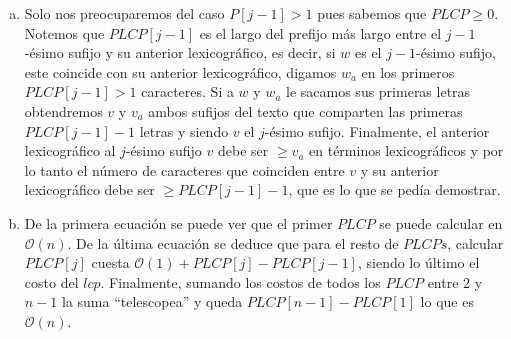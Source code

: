 \documentclass[dcc,uchile]{fcfmcourse}
\theoremstyle{plain}
\theoremstyle{definition}
\begin{document}
\begin{problems}
\begin{enumerate}[a)]
    \item Solo nos preocuparemos del caso $P[j-1]>1$ pues sabemos que $PLCP \ge 0$.\\
    Notemos que $PLCP[j-1]$ es el largo del prefijo más largo entre el $j-1$-ésimo sufijo y su anterior lexicográfico, es decir, si $w$ es el $j-1$-ésimo sufijo, este coincide con su anterior lexicográfico, digamos $w_{a}$ en los primeros $PLCP[j-1]>1$ caracteres. Si a $w$ y $w_{a}$ le sacamos sus primeras letras obtendremos $v$ y $v_{a}$ ambos sufijos del texto que comparten las primeras $PLCP[j-1]-1$ letras y siendo $v$ el $j$-ésimo sufijo. Finalmente, el anterior lexicográfico al $j$-ésimo sufijo $v$ debe ser $\ge v_{a}$ en términos lexicográficos y por lo tanto el número de caracteres que coinciden entre $v$ y su anterior lexicográfico debe ser $\ge PLCP[j-1]-1$, que es lo que se pedía demostrar.
    \item De la primera ecuación se puede ver que el primer $PLCP$ se puede calcular en $\mathcal{O}(n)$. De la última ecuación se deduce que para el resto de $PLCPs$, calcular $PLCP[j]$ cuesta $\mathcal{O}(1) + PLCP[j]-PLCP[j-1]$, siendo lo último el costo del $lcp$. Finalmente, sumando los costos de todos los $PLCP$ entre $2$ y $n-1$ la suma ``telescopea'' y queda $PLCP[n-1]-PLCP[1]$ lo que es $\mathcal{O}(n)$.
\end{enumerate}
\end{problems}
\end{document}
